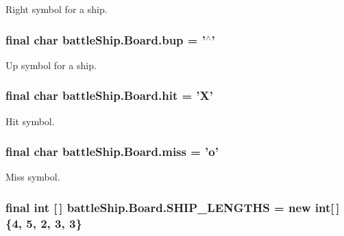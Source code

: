 Right symbol for a ship. 

\hypertarget{classbattleShip_1_1Board_a1182aaa1c9965e82514001411e92deda}{
\subsubsection[{bup}]{\setlength{\rightskip}{0pt plus 5cm}final char battle\-Ship.\-Board.\-bup = '$^\wedge$'\hspace{0.3cm}{\ttfamily [static]}}}\label{classbattleShip_1_1Board_a1182aaa1c9965e82514001411e92deda}


Up symbol for a ship. 

\hypertarget{classbattleShip_1_1Board_a46a888460556cbefb33d9cb048a610fc}{
\subsubsection[{hit}]{\setlength{\rightskip}{0pt plus 5cm}final char battle\-Ship.\-Board.\-hit = 'X'\hspace{0.3cm}{\ttfamily [static]}}}\label{classbattleShip_1_1Board_a46a888460556cbefb33d9cb048a610fc}


Hit symbol. 

\hypertarget{classbattleShip_1_1Board_a8c0a9cd8bd0c3829c01dccd8466c8ee6}{
\subsubsection[{miss}]{\setlength{\rightskip}{0pt plus 5cm}final char battle\-Ship.\-Board.\-miss = 'o'\hspace{0.3cm}{\ttfamily [static]}}}\label{classbattleShip_1_1Board_a8c0a9cd8bd0c3829c01dccd8466c8ee6}


Miss symbol. 

\hypertarget{classbattleShip_1_1Board_acc89eea78f07c10949b4c93b5fb14503}{
\subsubsection[{S\-H\-I\-P\-\_\-\-L\-E\-N\-G\-T\-H\-S}]{\setlength{\rightskip}{0pt plus 5cm}final int \mbox{[}$\,$\mbox{]} battle\-Ship.\-Board.\-S\-H\-I\-P\-\_\-\-L\-E\-N\-G\-T\-H\-S = new int\mbox{[}$\,$\mbox{]}\{4, 5, 2, 3, 3\}\hspace{0.3cm}{\ttfamily [static]}}}\label{classbattleShip_1_1Board_acc89eea78f07c10949b4c93b5fb14503}


